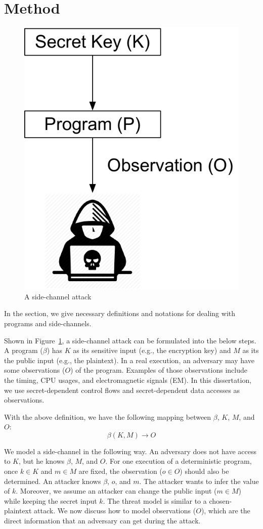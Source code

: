 \section{Method}\label{chapter3:method}
\begin{figure}
  \centering
  \includegraphics[width=.3\columnwidth]{./figures/chapter3/attack.pdf}
  \caption{A side-channel attack}\label{fig:side-channel-attack}
\end{figure}

In the section, we give necessary definitions and notations for dealing with
programs and side-channels.

Shown in Figure~\ref{fig:side-channel-attack}, a side-channel attack can be formulated into the below steps.  A program ($\beta$) has $K$ as its sensitive input (e.g., the encryption key) and $M$ as its the public input (e.g., the plaintext). In a real execution, an adversary may have
some observations ($O$) of the program. Examples of those observations include the
timing, CPU usages, and electromagnetic signals (EM). In this dissertation, we
use secret-dependent control flows and secret-dependent data
accesses as observations.

With the above definition, we have the following mapping between $\beta$,
$K$, $M$, and $O$:
\begin{displaymath}
  \beta(K, M) \rightarrow O
\end{displaymath}


We model a side-channel in the following way. An adversary does not have
access to $K$, but he knows $\beta$, $M$, and $O$. For one execution of a
deterministic program, once $k \in K$ and $m \in M$ are fixed, the observation
($o \in O$) should also be determined. An attacker knows $\beta$, $o$,
and $m$. The attacker wants to infer the value of $k$. Moreover, we assume
an attacker can change the public input ($m \in M$) while keeping the secret input $k$.
The threat model is similar to a chosen-plaintext attack.
We now discuss how to model observations ($O$),
which are the direct information that an adversary can get during the attack.

